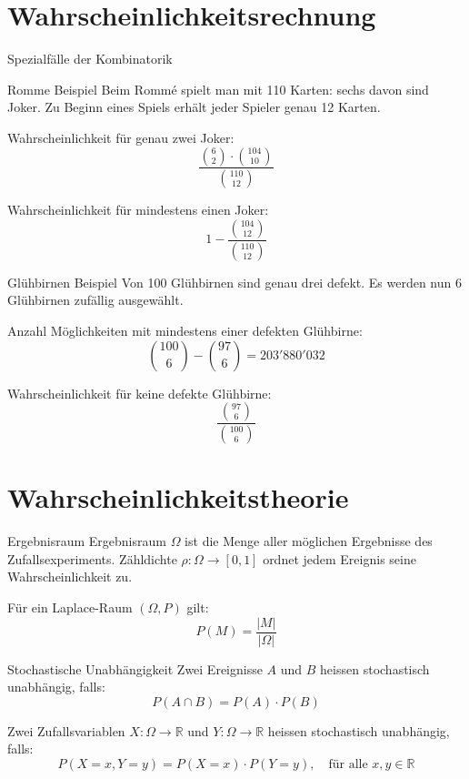 \section{Wahrscheinlichkeitsrechnung}
\begin{concept}{Spezialfälle der Kombinatorik}
\begin{example}{Romme Beispiel}
Beim Rommé spielt man mit 110 Karten: sechs davon sind Joker. Zu Beginn eines Spiels erhält jeder Spieler genau 12 Karten.

Wahrscheinlichkeit für genau zwei Joker:
$$
\frac{\binom{6}{2} \cdot\binom{104}{10}}{\binom{110}{12}}
$$

Wahrscheinlichkeit für mindestens einen Joker:
$$
1-\frac{\binom{104}{12}}{\binom{110}{12}}
$$
\end{example}

\begin{example}{Glühbirnen Beispiel}
Von 100 Glühbirnen sind genau drei defekt. Es werden nun 6 Glühbirnen zufällig ausgewählt.

Anzahl Möglichkeiten mit mindestens einer defekten Glühbirne:
$$
\binom{100}{6}-\binom{97}{6}=203'880'032
$$

Wahrscheinlichkeit für keine defekte Glühbirne:
$$
\frac{\binom{97}{6}}{\binom{100}{6}}
$$
\end{example}
\end{concept}

\section{Wahrscheinlichkeitstheorie}
\begin{definition}{Ergebnisraum}
Ergebnisraum $\Omega$ ist die Menge aller möglichen Ergebnisse des Zufallsexperiments. Zähldichte $\rho: \Omega \rightarrow[0,1]$ ordnet jedem Ereignis seine Wahrscheinlichkeit zu.

Für ein Laplace-Raum $(\Omega, P)$ gilt:
$$
P(M)=\frac{|M|}{|\Omega|}
$$
\end{definition}

\begin{theorem}{Stochastische Unabhängigkeit}
Zwei Ereignisse $A$ und $B$ heissen stochastisch unabhängig, falls:
$$
P(A \cap B)=P(A) \cdot P(B)
$$

Zwei Zufallsvariablen $X: \Omega \rightarrow \mathbb{R}$ und $Y: \Omega \rightarrow \mathbb{R}$ heissen stochastisch unabhängig, falls:
$$
P(X=x, Y=y)=P(X=x) \cdot P(Y=y), \quad \text{für alle } x, y \in \mathbb{R}
$$
\end{theorem}

